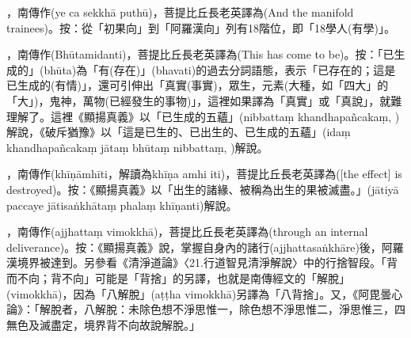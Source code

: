 \startitemgroup[noteitems]
\item{}，南傳作(ye ca sekkhā puthū)，菩提比丘長老英譯為(And the manifold trainees)。按：從「初果向」到「阿羅漢向」列有18階位，即「18學人(有學)」。
\stopitemgroup

\startitemgroup[noteitems]
\item{}，南傳作(Bhūtamidanti)，菩提比丘長老英譯為(This has come to be)。按：「已生成的」(bhūta)為「有(存在)」(bhavati)的過去分詞語態，表示「已存在的；這是已生成的(有情)」，還可引伸出「真實(事實)，眾生，元素(大種，如「四大」的「大」)，鬼神，萬物(已經發生的事物)」，這裡如果譯為「真實」或「真說」，就難理解了。這裡《顯揚真義》以「已生成的五蘊」(nibbattaṃ khandhapañcakaṃ, )解說，《破斥猶豫》以「這是已生的、已出生的、已生成的五蘊」(idaṃ khandhapañcakaṃ jātaṃ bhūtaṃ nibbattaṃ, )解說。
\stopitemgroup

\startitemgroup[noteitems]
\item{}，南傳作(khīṇāmhīti，解讀為khīṇa amhi iti)，菩提比丘長老英譯為([the effect] is destroyed)。按：《顯揚真義》以「出生的諸緣、被稱為出生的果被滅盡。」(jātiyā paccaye jātisaṅkhātaṃ phalaṃ khīṇanti)解說。
\stopitemgroup

\startitemgroup[noteitems]
\item{}，南傳作(ajjhattaṃ vimokkhā)，菩提比丘長老英譯為(through an internal deliverance)。按：《顯揚真義》說，掌握自身內的諸行(ajjhattasaṅkhāre)後，阿羅漢境界被達到。另參看《清淨道論》〈21.行道智見清淨解說〉中的行捨智段。「背而不向；背不向」可能是「背捨」的另譯，也就是南傳經文的「解脫」(vimokkhā)，因為「八解脫」(aṭṭha vimokkhā)另譯為「八背捨」。又，《阿毘曇心論》：「解脫者，八解脫：未除色想不淨思惟一，除色想不淨思惟二，淨思惟三，四無色及滅盡定，境界背不向故說解脫。」
\stopitemgroup

